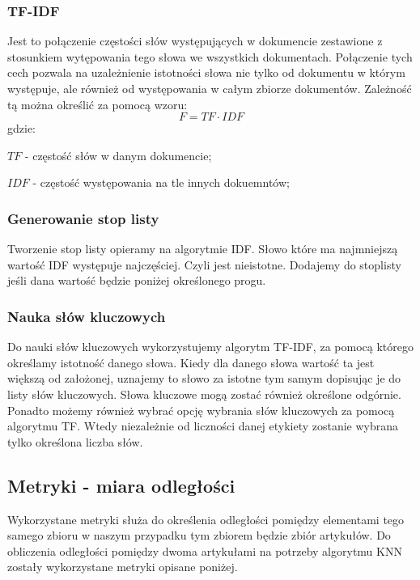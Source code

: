 \documentclass{classrep}
\begin{document}
\subsubsection{TF-IDF}
Jest to połączenie częstości słów występujących w dokumencie zestawione z stosunkiem wytępowania tego słowa we wszystkich
dokumentach. Połączenie tych cech pozwala na uzależnienie istotności słowa nie tylko od dokumentu w którym występuje,
ale również od występowania w całym zbiorze dokumentów. Zależność tą można określić za pomocą wzoru:
\begin{equation}
    F={TF}\cdot{IDF}
\end{equation}
gdzie:\\
\begin{description}
    \item $TF$ - częstość słów w danym dokumencie;
    \item $IDF$ - częstość występowania na tle innych dokuemntów;
\end{description}

\subsubsection{Generowanie stop listy}
Tworzenie stop listy opieramy na algorytmie IDF. Słowo które ma najmniejszą wartość IDF występuje najczęściej. Czyli jest
nieistotne. Dodajemy do stoplisty jeśli dana wartość będzie poniżej określonego progu.

\subsubsection{Nauka słów kluczowych}
Do nauki słów kluczowych wykorzystujemy algorytm TF-IDF, za pomocą którego określamy istotność
danego słowa. Kiedy dla danego słowa wartość ta jest większą od założonej, uznajemy to słowo za istotne tym samym dopisując je do
listy słów kluczowych. Słowa kluczowe mogą zostać również określone odgórnie. Ponadto możemy również wybrać
opcję wybrania słów kluczowych za pomocą algorytmu TF. Wtedy niezależnie od liczności danej etykiety
zostanie wybrana tylko określona liczba słów.

\subsection{Metryki - miara odległości} \label{wykorzystane_metryki}
Wykorzystane metryki służa do określenia odległości pomiędzy elementami tego samego zbioru w naszym przypadku tym
zbiorem będzie zbiór artykułów. Do obliczenia odległości pomiędzy dwoma artykułami na potrzeby algorytmu KNN zostały
wykorzystane metryki opisane poniżej.
\end{document}
